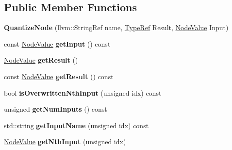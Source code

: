\subsection*{Public Member Functions}
\begin{DoxyCompactItemize}
\item 
\mbox{\label{classglow_1_1_quantize_node_ad9ae98fabf8b6a99a9bf354c754eb358}} 
{\bfseries Quantize\+Node} (llvm\+::\+String\+Ref name, \hyperlink{structglow_1_1_type}{Type\+Ref} Result, \hyperlink{structglow_1_1_node_value}{Node\+Value} Input)
\item 
\mbox{\label{classglow_1_1_quantize_node_a4da6714893ebc1835a2cbf8d5315cd27}} 
const \hyperlink{structglow_1_1_node_value}{Node\+Value} {\bfseries get\+Input} () const
\item 
\mbox{\label{classglow_1_1_quantize_node_a6132d71fd259ef5b5698772dd47cbaf1}} 
\hyperlink{structglow_1_1_node_value}{Node\+Value} {\bfseries get\+Result} ()
\item 
\mbox{\label{classglow_1_1_quantize_node_a049435d48a8161eae87df63514714a19}} 
const \hyperlink{structglow_1_1_node_value}{Node\+Value} {\bfseries get\+Result} () const
\item 
\mbox{\label{classglow_1_1_quantize_node_a84048f3edcf946bcd6bee94de81e3412}} 
bool {\bfseries is\+Overwritten\+Nth\+Input} (unsigned idx) const
\item 
\mbox{\label{classglow_1_1_quantize_node_a027c649fe7bb140452f5d1038f7a3f30}} 
unsigned {\bfseries get\+Num\+Inputs} () const
\item 
\mbox{\label{classglow_1_1_quantize_node_affa4e80f9381714b45a54019370cca0a}} 
std\+::string {\bfseries get\+Input\+Name} (unsigned idx) const
\item 
\mbox{\label{classglow_1_1_quantize_node_a90a01b979f7dac0bce51d29671cf1163}} 
\hyperlink{structglow_1_1_node_value}{Node\+Value} {\bfseries get\+Nth\+Input} (unsigned idx)
\item 

\end{DoxyCompactItemize}
